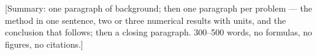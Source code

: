 %
%

[Summary: one paragraph of background; then one paragraph per problem --- the method in
one sentence, two or three numerical results with units, and the conclusion that follows;
then a closing paragraph. 300--500 words, no formulas, no figures, no citations.]

